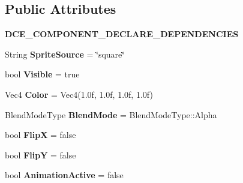 \subsection*{Public Attributes}
\begin{DoxyCompactItemize}
\item 
\hypertarget{classDCEngine_1_1Components_1_1Sprite_a3df45c37ba91a7943177fd2004cc3af0}{{\bfseries D\-C\-E\-\_\-\-C\-O\-M\-P\-O\-N\-E\-N\-T\-\_\-\-D\-E\-C\-L\-A\-R\-E\-\_\-\-D\-E\-P\-E\-N\-D\-E\-N\-C\-I\-E\-S}}\label{classDCEngine_1_1Components_1_1Sprite_a3df45c37ba91a7943177fd2004cc3af0}

\item 
\hypertarget{classDCEngine_1_1Components_1_1Sprite_ae96068b74a2c6ac0e022e33207321373}{String {\bfseries Sprite\-Source} = \char`\"{}square\char`\"{}}\label{classDCEngine_1_1Components_1_1Sprite_ae96068b74a2c6ac0e022e33207321373}

\item 
\hypertarget{classDCEngine_1_1Components_1_1Sprite_ae4aadaed2fecded3d06f60581abc077a}{bool {\bfseries Visible} = true}\label{classDCEngine_1_1Components_1_1Sprite_ae4aadaed2fecded3d06f60581abc077a}

\item 
\hypertarget{classDCEngine_1_1Components_1_1Sprite_a7b7889cbb298b8c4f3867a25ad191c57}{Vec4 {\bfseries Color} = Vec4(1.\-0f, 1.\-0f, 1.\-0f, 1.\-0f)}\label{classDCEngine_1_1Components_1_1Sprite_a7b7889cbb298b8c4f3867a25ad191c57}

\item 
\hypertarget{classDCEngine_1_1Components_1_1Sprite_a4c8b515a10a32dd21211c03d28fe7279}{Blend\-Mode\-Type {\bfseries Blend\-Mode} = Blend\-Mode\-Type\-::\-Alpha}\label{classDCEngine_1_1Components_1_1Sprite_a4c8b515a10a32dd21211c03d28fe7279}

\item 
\hypertarget{classDCEngine_1_1Components_1_1Sprite_ad5a9a5b654076bccdbba2c5f79d31e51}{bool {\bfseries Flip\-X} = false}\label{classDCEngine_1_1Components_1_1Sprite_ad5a9a5b654076bccdbba2c5f79d31e51}

\item 
\hypertarget{classDCEngine_1_1Components_1_1Sprite_a88d0aa8a41784047da7d36fde67b057d}{bool {\bfseries Flip\-Y} = false}\label{classDCEngine_1_1Components_1_1Sprite_a88d0aa8a41784047da7d36fde67b057d}

\item 
\hypertarget{classDCEngine_1_1Components_1_1Sprite_a82138f954d33c6e2576dd382f3df668a}{bool {\bfseries Animation\-Active} = false}\label{classDCEngine_1_1Components_1_1Sprite_a82138f954d33c6e2576dd382f3df668a}


\end{DoxyCompactItemize}

